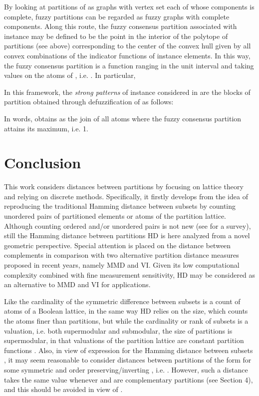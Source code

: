 \documentclass[a4paper,10pt]{article}
\begin{document}
By looking at partitions of  as graphs with vertex set  each of whose components is complete, fuzzy partitions can be regarded as fuzzy graphs with complete components.
Along this route, the fuzzy consensus partition  associated with instance  may be defined to be the point in the interior of
the polytope  of partitions (see above) corresponding to the center of the convex hull  given by all convex combinations of the
indicator functions  of instance elements. In this way, the fuzzy consensus partition is a function ranging in the unit interval  and taking values
on the atoms of , i.e. . In particular,


In this framework, the \textit{strong patterns} of instance  considered in \cite{CentralPartition} are the blocks of partition  obtained through
defuzzification of  as follows:

In words,  obtains as the join of all atoms where the fuzzy consensus partition attains its maximum, i.e. 1.

\section{Conclusion}
This work considers distances between partitions
by focusing on lattice theory and relying on discrete methods. Specifically, it firstly develops from the idea of reproducing the traditional Hamming distance between subsets by
counting unordered pairs of partitioned elements or atoms of the partition lattice. Although counting ordered and/or unordered pairs is not new (see \cite[Section 2.1]{Meila2007}
for a survey), still the Hamming distance between partitions HD is here analyzed from a novel geometric perspective. Special attention is placed on the distance between complements
in comparison with two alternative partition distance measures proposed in recent years, namely MMD and VI. Given its low computational complexity combined with fine measurement
sensitivity, HD may be considered as an alternative to MMD and VI for applications.

Like the cardinality of the symmetric difference between subsets is a count of atoms of a Boolean lattice, in the same way HD relies on the size, which counts the atoms
finer than partitions, but while the cardinality or rank of subsets is a valuation, i.e. both supermodular and submodular, the size of partitions is supermodular, in that valuations
of the partition lattice are constant partition functions \cite{Aigner79}. Also, in view of expression  for the Hamming distance between subsets
, it may seem reasonable to consider distances between partitions  of the form  for some symmetric and order preserving/inverting ,
i.e. . However, such a distance takes the same value  whenever  and  are complementary partitions (see Section 4), and this
should be avoided in view of \cite[Theorem 1]{Stanley1971}.
\end{document}
